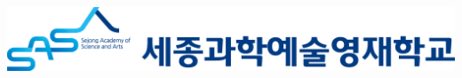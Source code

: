 \documentclass[a0,portrait]{a0poster}
\begin{document}
\begin{multicols}{2}







\begin{minipage}[b]{0.6\linewidth}
{\ } \phantom{}
\end{minipage}

\begin{flushright}
\begin{minipage}[b]{0.6\linewidth}
\includegraphics[width=20cm]{logo6-1.png}\\
\end{minipage}
\end{flushright}

\end{multicols}
\end{document}
